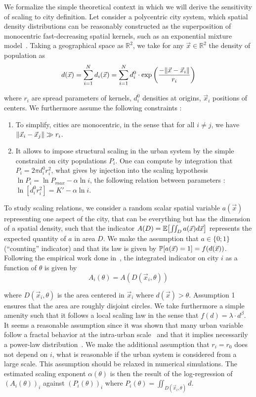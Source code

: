 \label{sec:formalization}

We formalize the simple theoretical context in which we will derive the sensitivity of scaling to city definition. Let consider a polycentric city system, which spatial density distributions can be reasonably constructed as the superposition of monocentric fast-decreasing spatial kernels, such as an exponential mixture model~\cite{anas1998urban}. Taking a geographical space as $\mathbb{R}^2$, we take for any $\vec{x}\in\mathbb{R}^2$ the density of population as
\begin{equation}
d(\vec{x}) = \sum_{i=1}^{N}{d_i(\vec{x})} = \sum_{i=1}^{N}{d_i^0\cdot \exp{\left(\frac{-\| \vec{x}-\vec{x}_i \|}{r_i}\right)}}
\end{equation}

where $r_i$ are spread parameters of kernels, $d_i^0$ densities at origins, $\vec{x}_i$ positions of centers. We furthermore assume the following constraints :

\begin{enumerate}
\item To simplify, cities are monocentric, in the sense that for all $i\neq j$, we have $\| \vec{x}_i - \vec{x}_j \|\gg r_i$.
\item It allows to impose structural scaling in the urban system by the simple constraint on city populations $P_i$. One can compute by integration that $P_i=2\pi d_i^0 r_i^2$, what gives by injection into the scaling hypothesis $\ln{P_i}=\ln{P_{max}}-\alpha \ln{i}$, the following relation between parameters : $\ln{\left[d_i^0 r_i^2\right]}=K' - \alpha \ln{i}$.
\end{enumerate}

To study scaling relations, we consider a random scalar spatial variable $a(\vec{x})$ representing one aspect of the city, that can be everything but has the dimension of a spatial density, such that the indicator $A(D)=\operatorname{\mathbb{E}}\!\left[\iint_D{a(\vec{x})d\vec{x}}\right]$ represents the expected quantity of $a$ in area $D$. We make the assumption that $a\in \{0;1\}$ (``counting'' indicator) and that its law is given by $\operatorname{\mathbb{P}}\!\left[a(\vec{x})=1\right]=f(d(\vec{x}))$. Following the empirical work done in~\cite{cottineau2015scaling}, the integrated indicator on city $i$ as a function of $\theta$ is given by
\[
A_i(\theta) = A(D(\vec{x}_i, \theta))
\]

where $D(\vec{x}_i, \theta)$ is the area centered in $\vec{x}_i$ where $d(\vec{x})>\theta$. Assumption 1 ensures that the area are roughly disjoint circles. We take furthermore a simple amenity such that it follows a local scaling law in the sense that $f(d)=\lambda\cdot d^\beta$. It seems a reasonable assumption since it was shown that many urban variable follow a fractal behavior at the intra-urban scale~\cite{keersmaecker2003using} and that it implies necessarily a power-law distribution~\cite{chen2010characterizing}. We make the additional assumption that $r_i=r_0$ does not depend on $i$, what is reasonable if the urban system is considered from a large scale. This assumption should be relaxed in numerical simulations. The estimated scaling exponent $\alpha(\theta)$ is then the result of the log-regression of $(A_i(\theta))_i$ against $(P_i(\theta))_i$ where $P_i(\theta)=\iint_{D(\vec{x}_i,\theta)}{d}$.


